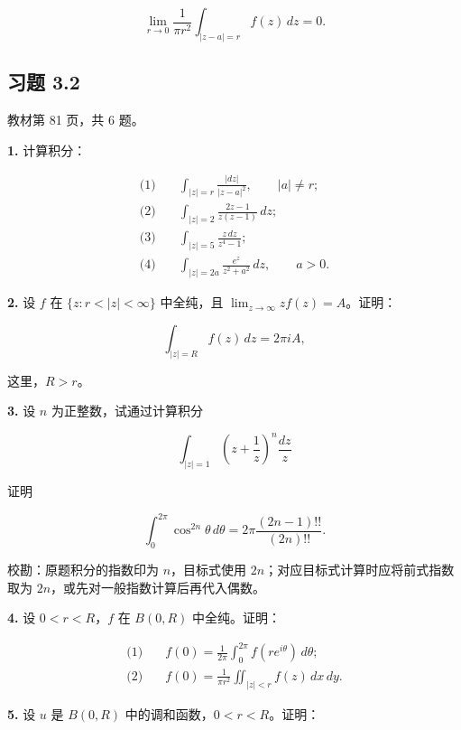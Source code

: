 \documentclass[11pt,a4paper]{article}
\begin{document}
\[
\lim_{r\to0}\frac1{\pi r^2}\int_{|z-a|=r}f(z)\,dz=0.
\]

\subsection{习题 3.2}\label{ch03-practice-ux4e60ux9898-32}

教材第 81 页，共 6 题。

\par{}
\noindent\textbf{1.} 计算积分：

\[
\begin{aligned}
\text{(1)}\quad&\int_{|z|=r}\frac{|dz|}{|z-a|^2},\qquad |a|\ne r;\\
\text{(2)}\quad&\int_{|z|=2}\frac{2z-1}{z(z-1)}\,dz;\\
\text{(3)}\quad&\int_{|z|=5}\frac{z\,dz}{z^4-1};\\
\text{(4)}\quad&\int_{|z|=2a}\frac{e^z}{z^2+a^2}\,dz,\qquad a>0.
\end{aligned}
\]

\par{}
\noindent\textbf{2.} 设 \(f\) 在 \(\{z:r<|z|<\infty\}\) 中全纯，且
\(\lim_{z\to\infty}zf(z)=A\)。证明：

\[
\int_{|z|=R}f(z)\,dz=2\pi iA,
\]

这里，\(R>r\)。

\par{}
\noindent\textbf{3.} 设 \(n\) 为正整数，试通过计算积分

\[
\int_{|z|=1}\left(z+\frac1z\right)^n\frac{dz}{z}
\]

证明

\[
\int_0^{2\pi}\cos^{2n}\theta\,d\theta
=2\pi\frac{(2n-1)!!}{(2n)!!}.
\]

校勘：原题积分的指数印为 \(n\)，目标式使用
\(2n\)；对应目标式计算时应将前式指数取为
\(2n\)，或先对一般指数计算后再代入偶数。

\par{}
\noindent\textbf{4.} 设 \(0<r<R\)，\(f\) 在 \(B(0,R)\) 中全纯。证明：

\[
\begin{aligned}
\text{(1)}\quad&f(0)=\frac1{2\pi}\int_0^{2\pi}f(re^{i\theta})\,d\theta;\\
\text{(2)}\quad&f(0)=\frac1{\pi r^2}\iint_{|z|<r}f(z)\,dx\,dy.
\end{aligned}
\]

\par{}
\noindent\textbf{5.} 设 \(u\) 是 \(B(0,R)\) 中的调和函数，\(0<r<R\)。证明：
\end{document}
